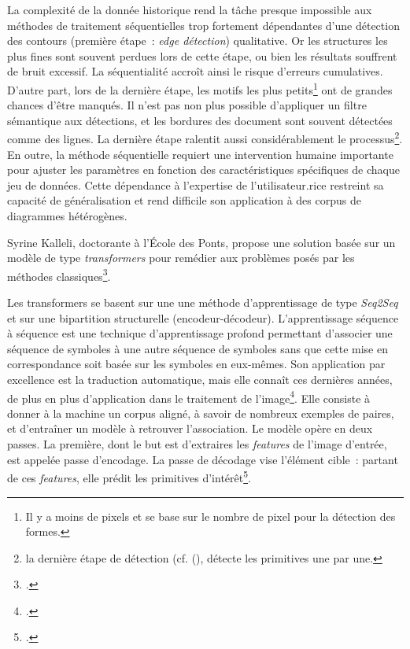 La complexité de la donnée historique rend la tâche presque impossible
aux méthodes de traitement séquentielles trop fortement dépendantes d'une
détection des contours (première étape~: \emph{edge détection})
qualitative. Or les structures les plus fines sont souvent perdues lors
de cette étape, ou bien les résultats souffrent de bruit excessif. La
séquentialité accroît ainsi le risque d'erreurs cumulatives. D'autre
part, lors de la dernière étape, les motifs les plus petits\footnote{Il
  y a moins de pixels et \ransac se base sur le nombre de pixel pour la
  détection des formes.} ont de grandes chances d'être manqués. Il n'est
pas non plus possible d'appliquer un filtre sémantique aux détections,
et les bordures des document sont souvent détectées comme des lignes. La
dernière étape ralentit aussi considérablement le processus\footnote{la
  dernière étape de détection (cf.
  (\cite{noauthor_ransac_nodate}), détecte les
  primitives une par une.}. En outre, la méthode séquentielle requiert
une intervention humaine importante pour ajuster les paramètres en
fonction des caractéristiques spécifiques de chaque jeu de données.
Cette dépendance à l'expertise de l'utilisateur.rice restreint sa capacité de
généralisation et rend difficile son application à des corpus de
diagrammes hétérogènes.

Syrine Kalleli, doctorante à l'École des Ponts, propose une solution
basée sur un modèle de type \emph{transformers} pour remédier aux
problèmes posés par les méthodes classiques\footcite{kalleli_historical_2024}.

Les transformers se basent sur une une méthode d'apprentissage de type
\textit{Seq2Seq} et sur une bipartition structurelle (encodeur-décodeur).
L'apprentissage séquence à séquence est une technique
d'apprentissage profond permettant d'associer une séquence de symboles à
une autre séquence de symboles sans que cette mise en correspondance
soit basée sur les symboles en eux-mêmes. Son application par excellence
est la traduction automatique, mais elle connaît ces dernières années,
de plus en plus d'application dans le traitement de l'image\footcite{dosovitskiy_image_2021}. Elle
consiste à donner à la machine un corpus aligné, à savoir de
nombreux exemples de paires, et d'entraîner un modèle à retrouver
l'association. Le modèle opère en deux passes. La première, dont le but
est d'extraires les \emph{features} de l'image d'entrée, est appelée
passe d'encodage. La passe de décodage vise l'élément cible~: partant de
ces \emph{features}, elle prédit les primitives d'intérêt\footcite[p.90]{charniak_introduction_2021}.

